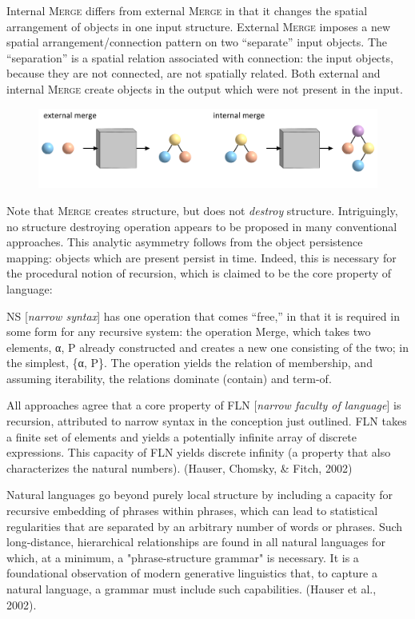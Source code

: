  Internal \textsc{Merge} differs from external \textsc{Merge} in that it changes the spatial arrangement of objects in one input structure. External \textsc{Merge} imposes a new spatial arrangement/connection pattern on two “separate” input objects. The “separation” is a spatial relation associated with connection: the input objects, because they are not connected, are not spatially related. Both external and internal \textsc{Merge} create objects in the output which were not present in the input. 

  
\begin{figure}
\includegraphics[width=\textwidth]{figures/Tilsen-img109.png}
\caption{\missingcaption}
\label{fig:}
\end{figure}
 

  Note that \textsc{Merge} creates structure, but does not \textit{destroy} structure. Intriguingly, no structure destroying operation appears to be proposed in many conventional approaches. This analytic asymmetry follows from the object persistence mapping: objects which are present persist in time. Indeed, this is necessary for the procedural notion of recursion, which is claimed to be the core property of language:

NS [\textit{narrow syntax}] has one operation that comes “free,” in that it is required in some form for any recursive system: the operation Merge, which takes two elements, α, P already constructed and creates a new one consisting of the two; in the simplest, \{α, P\}. The operation yields the relation of membership, and assuming iterability, the relations dominate (contain) and term-of. \citep{Chomsky2001b}

All approaches agree that a core property of FLN [\textit{narrow faculty of language}] is recursion, attributed to narrow syntax in the conception just outlined. FLN takes a finite set of elements and yields a potentially infinite array of discrete expressions. This capacity of FLN yields discrete infinity (a property that also characterizes the natural numbers). (Hauser, Chomsky, \& Fitch, 2002)

Natural languages go beyond purely local structure by including a capacity for recursive embedding of phrases within phrases, which can lead to statistical regularities that are separated by an arbitrary number of words or phrases. Such long-distance, hierarchical relationships are found in all natural languages for which, at a minimum, a "phrase-structure grammar" is necessary. It is a foundational observation of modern generative linguistics that, to capture a natural language, a grammar must include such capabilities. (Hauser et al., 2002). 

